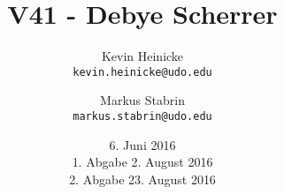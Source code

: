 


\title{%
    V41 - Debye Scherrer
}
\author{%
    Kevin Heinicke\\
    \texttt{kevin.heinicke@udo.edu}
    \and
    Markus Stabrin\\
    \texttt{markus.stabrin@udo.edu}
}
\date{%
    6. Juni 2016\\
    {\small 1. Abgabe} 2. August 2016\\
    {\small 2. Abgabe} 23. August 2016\\
}

    \maketitle%
    \tableofcontents
    \newpage
    
    

    \printbibliography
    

